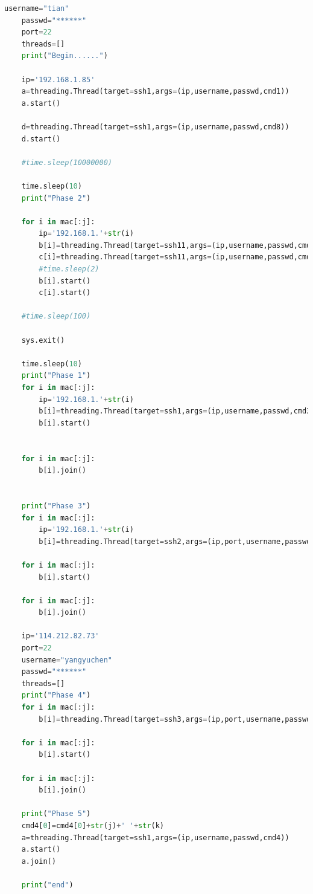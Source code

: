 \documentclass[12pt,a4paper]{article}
\begin{document}
\begin{lstlisting}[language=Python]
    username="tian"
    passwd="******"
    port=22
    threads=[]
    print("Begin......")

    ip='192.168.1.85'
    a=threading.Thread(target=ssh1,args=(ip,username,passwd,cmd1))
    a.start()

    d=threading.Thread(target=ssh1,args=(ip,username,passwd,cmd8))
    d.start()

    #time.sleep(10000000)

    time.sleep(10)
    print("Phase 2")

    for i in mac[:j]:
        ip='192.168.1.'+str(i)
        b[i]=threading.Thread(target=ssh11,args=(ip,username,passwd,cmd2[i-86]))
        c[i]=threading.Thread(target=ssh11,args=(ip,username,passwd,cmd7[i-86]))
        #time.sleep(2)
        b[i].start()
        c[i].start()

    #time.sleep(100)

    sys.exit()

    time.sleep(10)
    print("Phase 1")
    for i in mac[:j]:
        ip='192.168.1.'+str(i)
        b[i]=threading.Thread(target=ssh1,args=(ip,username,passwd,cmd3))
        b[i].start()


    for i in mac[:j]:
        b[i].join()

    
    print("Phase 3")
    for i in mac[:j]:
        ip='192.168.1.'+str(i)
        b[i]=threading.Thread(target=ssh2,args=(ip,port,username,passwd,'/home/tian/ycyang/result.pcap','/home/ycyang/'+str(i)+'.pcap'))

    for i in mac[:j]:
        b[i].start()

    for i in mac[:j]:
        b[i].join()
    
    ip='114.212.82.73'
    port=22
    username="yangyuchen"
    passwd="******"
    threads=[]
    print("Phase 4")
    for i in mac[:j]:
        b[i]=threading.Thread(target=ssh3,args=(ip,port,username,passwd,'/home/ycyang/'+str(i)+'.pcap','/home/yangyuchen/Research/automation/multiflow/'+str(i)+'.pcap'))

    for i in mac[:j]:
        b[i].start()

    for i in mac[:j]:
        b[i].join()

    print("Phase 5")
    cmd4[0]=cmd4[0]+str(j)+' '+str(k)
    a=threading.Thread(target=ssh1,args=(ip,username,passwd,cmd4))
    a.start()
    a.join()
    
    print("end")
\end{lstlisting}
\end{document}
